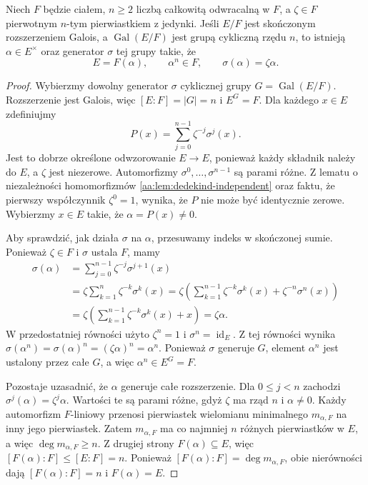 \begin{twierdzenie}\label{aa:tw:kummer-converse}
Niech $F$ będzie ciałem, $n\geq2$ liczbą całkowitą
odwracalną w $F$, a $\zeta\in F$ pierwotnym
$n$-tym pierwiastkiem z jedynki. Jeśli $E/F$ jest
skończonym rozszerzeniem Galois, a $\operatorname{Gal}(E/F)$
jest grupą cykliczną rzędu $n$, to istnieją
$\alpha\in E^\times$ oraz generator $\sigma$ tej grupy takie, że
\[
E=F(\alpha),\qquad \alpha^n\in F,\qquad
\sigma(\alpha)=\zeta\alpha.
\]
\end{twierdzenie}
\begin{proof}
Wybierzmy dowolny generator $\sigma$ cyklicznej grupy
$G=\operatorname{Gal}(E/F)$. Rozszerzenie jest Galois,
więc $[E:F]=|G|=n$ i $E^G=F$.
Dla każdego $x\in E$ zdefiniujmy
\[
P(x)=\sum_{j=0}^{n-1}\zeta^{-j}\sigma^j(x).
\]
Jest to dobrze określone odwzorowanie $E\to E$, ponieważ
każdy składnik należy do $E$, a $\zeta$ jest niezerowe.
Automorfizmy $\sigma^0,\ldots,\sigma^{n-1}$ są parami różne.
Z lematu o niezależności homomorfizmów
\ref{aa:lem:dedekind-independent} oraz faktu, że pierwszy
współczynnik $\zeta^0=1$, wynika, że $P$ nie może być
identycznie zerowe. Wybierzmy $x\in E$ takie, że
$\alpha=P(x)\neq0$.

Aby sprawdzić, jak działa $\sigma$ na $\alpha$, przesuwamy
indeks w skończonej sumie. Ponieważ $\zeta\in F$ i $\sigma$
ustala $F$, mamy
\[
\begin{aligned}
\sigma(\alpha)
 &=\sum_{j=0}^{n-1}\zeta^{-j}\sigma^{j+1}(x)\\
 &=\zeta\sum_{k=1}^{n}\zeta^{-k}\sigma^k(x)
 =\zeta\left(\sum_{k=1}^{n-1}\zeta^{-k}\sigma^k(x)
       +\zeta^{-n}\sigma^n(x)\right)\\
 &=\zeta\left(\sum_{k=1}^{n-1}\zeta^{-k}\sigma^k(x)+x\right)
 =\zeta\alpha.
\end{aligned}
\]
W przedostatniej równości użyto $\zeta^n=1$
i $\sigma^n=\operatorname{id}_E$.
Z tej równości wynika
$\sigma(\alpha^n)=\sigma(\alpha)^n
=(\zeta\alpha)^n=\alpha^n$.
Ponieważ $\sigma$ generuje $G$, element $\alpha^n$
jest ustalony przez całe $G$, a więc $\alpha^n\in E^G=F$.

Pozostaje uzasadnić, że $\alpha$ generuje całe rozszerzenie.
Dla $0\leq j<n$ zachodzi
$\sigma^j(\alpha)=\zeta^j\alpha$.
Wartości te są parami różne, gdyż $\zeta$ ma rząd $n$
i $\alpha\neq0$.
Każdy automorfizm $F$-liniowy przenosi pierwiastek wielomianu
minimalnego $m_{\alpha,F}$ na inny jego pierwiastek.
Zatem $m_{\alpha,F}$ ma co najmniej $n$ różnych pierwiastków
w $E$, a więc $\deg m_{\alpha,F}\geq n$.
Z drugiej strony $F(\alpha)\subseteq E$, więc
$[F(\alpha):F]\leq[E:F]=n$.
Ponieważ $[F(\alpha):F]=\deg m_{\alpha,F}$,
obie nierówności dają $[F(\alpha):F]=n$ i $F(\alpha)=E$.
\end{proof}

